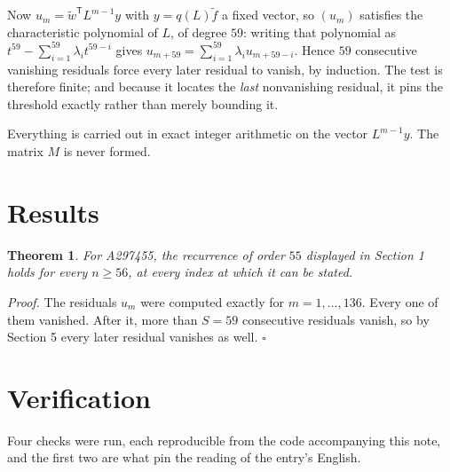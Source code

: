\documentclass[11pt]{article}
\newtheorem{theorem}{Theorem}
\theoremstyle{definition}
\begin{document}
Now $u_m = \tilde w^{\mathsf T} L^{m-1} y$ with $y = q(L)\tilde f$ a fixed vector, so $(u_m)$ satisfies the characteristic polynomial of $L$, of degree $59$: writing that polynomial as $t^{59} - \sum_{i=1}^{59} \lambda_i t^{59-i}$ gives $u_{m+59} = \sum_{i=1}^{59} \lambda_i u_{m+59-i}$. Hence $59$ consecutive vanishing residuals force every later residual to vanish, by induction. The test is therefore finite; and because it locates the {\itshape last} nonvanishing residual, it pins the threshold exactly rather than merely bounding it.

Everything is carried out in exact integer arithmetic on the vector $L^{m-1}y$. The matrix $M$ is never formed.

\section{Results}

\begin{theorem} For A297455, the recurrence of order $55$ displayed in Section 1 holds for every $n \ge 56$, at every index at which it can be stated.\end{theorem}

{\itshape Proof.} The residuals $u_m$ were computed exactly for $m = 1,\dots,136$. Every one of them vanished. After it, more than $S = 59$ consecutive residuals vanish, so by Section 5 every later residual vanishes as well. $\square$

\section{Verification}

Four checks were run, each reproducible from the code accompanying this note, and the first two are what pin the reading of the entry's English.
\end{document}
